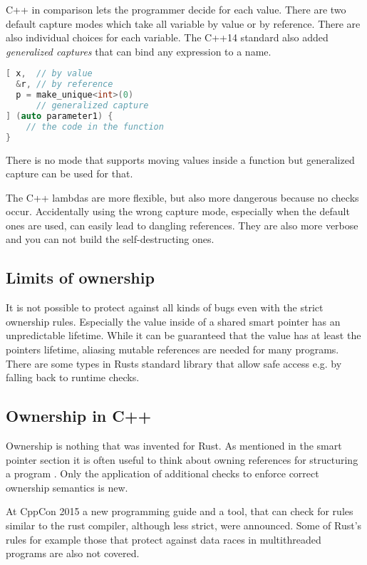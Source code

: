 \documentclass[conference,twocolumn]{IEEEtran}
\begin{document}
C++ in comparison lets the programmer decide for each value. There are two default capture modes which take all variable by value or by reference. There are also individual choices for each variable. The C++14 standard also added \emph{generalized captures} that can bind any expression to a name. \cite{meyers2014effective}
\begin{lstlisting}[language=c++, frame=single]
[ x,  // by value
  &r, // by reference
  p = make_unique<int>(0)
      // generalized capture
] (auto parameter1) {
    // the code in the function
}
\end{lstlisting}
There is no mode that supports moving values inside a function but generalized capture can be used for that.

The C++ lambdas are more flexible, but also more dangerous because no checks occur. Accidentally using the wrong capture mode, especially when the default ones are used, can easily lead to dangling references. They are also more verbose and you can not build the self-destructing ones.

\subsection{Limits of ownership}
It is not possible to protect against all kinds of bugs even with the strict ownership rules. Especially the value inside of a shared smart pointer has an unpredictable lifetime. While it can be guaranteed that the value has at least the pointers lifetime, aliasing mutable references are needed for many programs. There are some types in Rusts standard library that allow safe access e.g. by falling back to runtime checks.


\subsection{Ownership in C++}
Ownership is nothing that was invented for Rust. As mentioned in the smart pointer section it is often useful to think about owning references for structuring a program \cite{meyers2014effective}. Only the application of additional checks to enforce correct ownership semantics is new.

At CppCon 2015 a new programming guide and a tool, that can check for rules similar to the rust compiler, although less strict, were announced. Some of Rust's rules for example those that protect against data races in multithreaded programs are also not covered. \cite{cppCheckHSutter}
\end{document}
